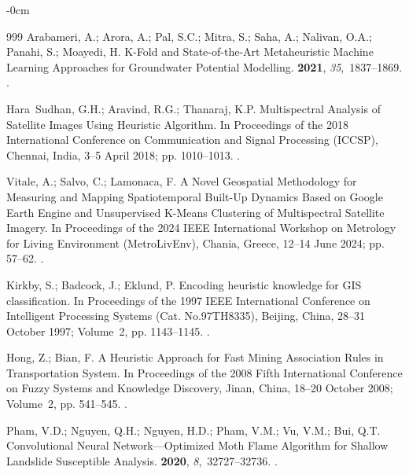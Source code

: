 \documentclass[jimaging,article,accept,pdftex,moreauthors]{Definitions/mdpi}
\begin{document}
\begin{adjustwidth}{-\extralength}{0cm}
\begin{thebibliography}{999}
Arabameri, A.; Arora, A.; Pal, S.C.; Mitra, S.; Saha, A.; Nalivan, O.A.;
  Panahi, S.; Moayedi, H.
\newblock K-Fold and State-of-the-Art Metaheuristic Machine Learning Approaches
  for Groundwater Potential Modelling.
 {\bf 2021}, {\em 35},~1837--1869.
.

Hara~Sudhan, G.H.; Aravind, R.G.; Thanaraj, K.P.
\newblock Multispectral Analysis of Satellite Images Using Heuristic Algorithm.
\newblock In Proceedings of the 2018 International Conference on Communication
  and Signal Processing (ICCSP),  Chennai, India, 3--5 April 2018; pp. 1010--1013.
.

Vitale, A.; Salvo, C.; Lamonaca, F.
\newblock A Novel Geospatial Methodology for Measuring and Mapping
  Spatiotemporal Built-Up Dynamics Based on Google Earth Engine and
  Unsupervised K-Means Clustering of Multispectral Satellite Imagery.
\newblock In Proceedings of the 2024 IEEE International Workshop on Metrology
  for Living Environment (MetroLivEnv),  Chania, Greece, 12--14 June 2024; pp. 57--62.
.

Kirkby, S.; Badcock, J.; Eklund, P.
\newblock Encoding heuristic knowledge for GIS classification.
\newblock In Proceedings of the 1997 IEEE International Conference on
  Intelligent Processing Systems (Cat. No.97TH8335),  Beijing, China,  28--31 October 1997; Volume~2, pp.
  1143--1145.
.

Hong, Z.; Bian, F.
\newblock A Heuristic Approach for Fast Mining Association Rules in
  Transportation System.
\newblock In Proceedings of the 2008 Fifth International Conference on Fuzzy
  Systems and Knowledge Discovery,  Jinan, China, 18--20 October 2008; Volume~2, pp. 541--545.
.

Pham, V.D.; Nguyen, Q.H.; Nguyen, H.D.; Pham, V.M.; Vu, V.M.; Bui, Q.T.
\newblock Convolutional Neural Network—Optimized Moth Flame Algorithm for
  Shallow Landslide Susceptible Analysis.
 {\bf 2020}, {\em 8},~32727--32736.
.


\end{thebibliography}
\end{adjustwidth}
\end{document}
